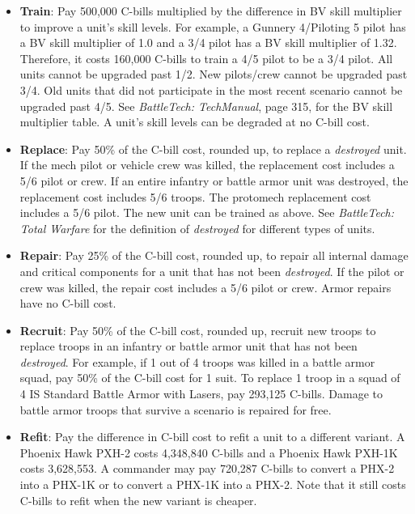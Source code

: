 \documentclass{article}
\begin{document}
\begin{itemize}

\item {\bfseries Train}: Pay 500,000 C-bills multiplied by the difference in BV skill multiplier to improve a unit's skill levels.
For example, a Gunnery 4/Piloting 5 pilot has a BV skill multiplier of 1.0 and a 3/4 pilot has a BV skill multiplier of 1.32.
Therefore, it costs 160,000 C-bills to train a 4/5 pilot to be a 3/4 pilot.
All units cannot be upgraded past 1/2.
New pilots/crew cannot be upgraded past 3/4.
Old units that did not participate in the most recent scenario cannot be upgraded past 4/5.
See \emph{BattleTech: TechManual}, page 315, for the BV skill multiplier table.
A unit's skill levels can be degraded at no C-bill cost.

\item {\bfseries Replace}: Pay 50\% of the C-bill cost, rounded up, to replace a \emph{destroyed} unit.
If the mech pilot or vehicle crew was killed, the replacement cost includes a 5/6 pilot or crew.
If an entire infantry or battle armor unit was destroyed, the replacement cost includes 5/6 troops.
The protomech replacement cost includes a 5/6 pilot.
The new unit can be trained as above.
See \emph{BattleTech: Total Warfare} for the definition of \emph{destroyed} for different types of units.

\item {\bfseries Repair}: Pay 25\% of the C-bill cost, rounded up, to repair all internal damage and critical components for a unit that has not been \emph{destroyed}.
If the pilot or crew was killed, the repair cost includes a 5/6 pilot or crew.
Armor repairs have no C-bill cost.

\item {\bfseries Recruit}: Pay 50\% of the C-bill cost, rounded up, recruit new troops to replace troops in an infantry or battle armor unit that has not been \emph{destroyed}.
For example, if 1 out of 4 troops was killed in a battle armor squad, pay 50\% of the C-bill cost for 1 suit.
To replace 1 troop in a squad of 4 IS Standard Battle Armor with Lasers, pay 293,125 C-bills.
Damage to battle armor troops that survive a scenario is repaired for free.

\item {\bfseries Refit}: Pay the difference in C-bill cost to refit a unit to a different variant.
A Phoenix Hawk PXH-2 costs 4,348,840 C-bills and a Phoenix Hawk PXH-1K costs 3,628,553.
A commander may pay 720,287 C-bills to convert a PHX-2 into a PHX-1K or to convert a PHX-1K into a PHX-2.
Note that it still costs C-bills to refit when the new variant is cheaper.


\end{itemize}
\end{document}
